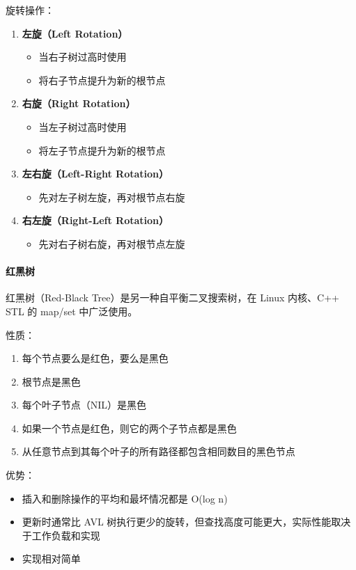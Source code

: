 旋转操作：
\begin{enumerate}
  \item \textbf{左旋（Left Rotation）}
    \begin{itemize}
      \item 当右子树过高时使用
      \item 将右子节点提升为新的根节点
    \end{itemize}

  \item \textbf{右旋（Right Rotation）}
    \begin{itemize}
      \item 当左子树过高时使用
      \item 将左子节点提升为新的根节点
    \end{itemize}

  \item \textbf{左右旋（Left-Right Rotation）}
    \begin{itemize}
      \item 先对左子树左旋，再对根节点右旋
    \end{itemize}

  \item \textbf{右左旋（Right-Left Rotation）}
    \begin{itemize}
      \item 先对右子树右旋，再对根节点左旋
    \end{itemize}
\end{enumerate}

\paragraph{红黑树}

红黑树（Red-Black Tree）是另一种自平衡二叉搜索树，在 Linux 内核、C++ STL 的 map/set 中广泛使用。

性质：
\begin{enumerate}
  \item 每个节点要么是红色，要么是黑色
  \item 根节点是黑色
  \item 每个叶子节点（NIL）是黑色
  \item 如果一个节点是红色，则它的两个子节点都是黑色
  \item 从任意节点到其每个叶子的所有路径都包含相同数目的黑色节点
\end{enumerate}

优势：
\begin{itemize}
  \item 插入和删除操作的平均和最坏情况都是 O(log n)
  \item 更新时通常比 AVL 树执行更少的旋转，但查找高度可能更大，实际性能取决于工作负载和实现
  \item 实现相对简单
\end{itemize}

